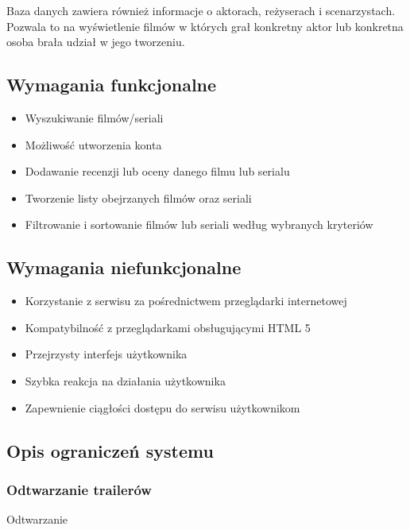 \documentclass[12pt]{article}
\begin{document}
	Baza danych zawiera również informacje o aktorach, reżyserach i scenarzystach. Pozwala to na wyświetlenie filmów w których grał konkretny aktor lub konkretna osoba brała udział w jego tworzeniu.
		
		\subsection{Wymagania funkcjonalne}
			\begin{itemize}
				\item Wyszukiwanie filmów/seriali
				\item Możliwość utworzenia konta
				\item Dodawanie recenzji lub oceny danego filmu lub serialu
				\item Tworzenie listy obejrzanych filmów oraz seriali
				\item Filtrowanie i sortowanie filmów lub seriali według wybranych kryteriów
			\end{itemize}
		
		\subsection{Wymagania niefunkcjonalne}
			\begin{itemize}
				\item Korzystanie z serwisu za pośrednictwem przeglądarki internetowej
				\item Kompatybilność z przeglądarkami obsługującymi HTML 5
				\item Przejrzysty interfejs użytkownika
				\item Szybka reakcja na działania użytkownika
				\item Zapewnienie ciągłości dostępu do serwisu użytkownikom
			\end{itemize}
		
		\subsection{Opis ograniczeń systemu}
			\subsubsection{Odtwarzanie trailerów}
				Odtwarzanie 

		
\end{document}
